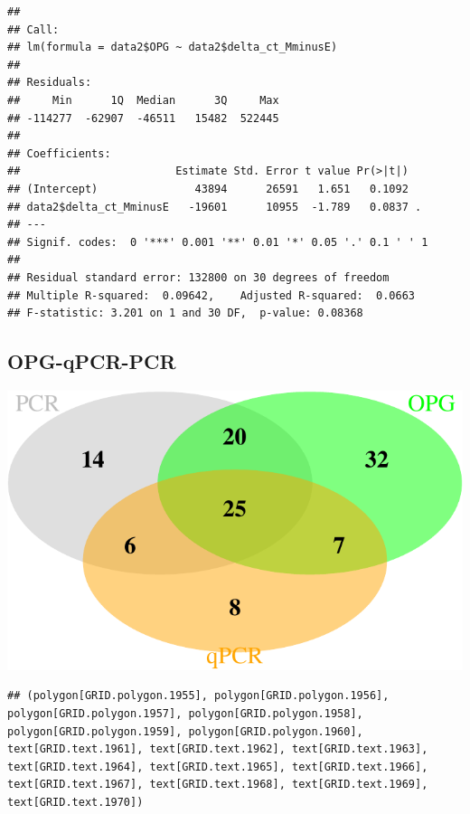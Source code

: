 \documentclass[]{article}
\let\origfigure\figure
\let\endorigfigure\endfigure
\renewenvironment{figure}[1][2] { 
    \expandafter\origfigure\expandafter[H] 
} { 
    \endorigfigure 
}
\begin{document}
\begin{verbatim}
## 
## Call:
## lm(formula = data2$OPG ~ data2$delta_ct_MminusE)
## 
## Residuals:
##     Min      1Q  Median      3Q     Max 
## -114277  -62907  -46511   15482  522445 
## 
## Coefficients:
##                        Estimate Std. Error t value Pr(>|t|)  
## (Intercept)               43894      26591   1.651   0.1092  
## data2$delta_ct_MminusE   -19601      10955  -1.789   0.0837 .
## ---
## Signif. codes:  0 '***' 0.001 '**' 0.01 '*' 0.05 '.' 0.1 ' ' 1
## 
## Residual standard error: 132800 on 30 degrees of freedom
## Multiple R-squared:  0.09642,    Adjusted R-squared:  0.0663 
## F-statistic: 3.201 on 1 and 30 DF,  p-value: 0.08368
\end{verbatim}

\subsection{OPG-qPCR-PCR}\label{opg-qpcr-pcr-1}

\begin{figure}[htbp]
\centering
\includegraphics{Data_Analysis_Alice_files/figure-latex/venn2_3.75-1.pdf}
\caption{\label{fig:venn1}Comparison of detection: PCR vs flotation vs
qPCR}
\end{figure}

\begin{verbatim}
## (polygon[GRID.polygon.1955], polygon[GRID.polygon.1956], polygon[GRID.polygon.1957], polygon[GRID.polygon.1958], polygon[GRID.polygon.1959], polygon[GRID.polygon.1960], text[GRID.text.1961], text[GRID.text.1962], text[GRID.text.1963], text[GRID.text.1964], text[GRID.text.1965], text[GRID.text.1966], text[GRID.text.1967], text[GRID.text.1968], text[GRID.text.1969], text[GRID.text.1970])
\end{verbatim}
\end{document}
